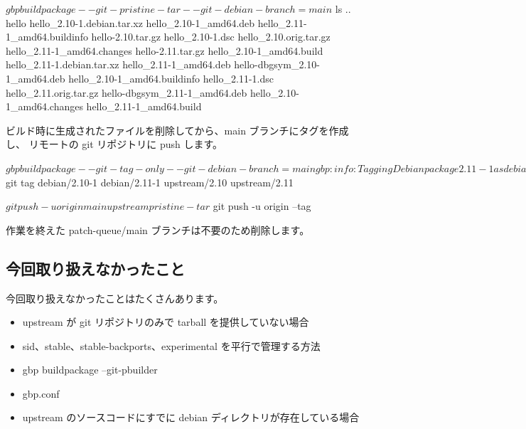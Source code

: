\documentclass[mingoth,a4paper]{jsarticle}
\begin{document}
\begin{commandline}
$ gbp buildpackage --git-pristine-tar --git-debian-branch=main

$ ls ..
hello                          hello_2.10-1.debian.tar.xz    hello_2.10-1_amd64.deb      hello_2.11-1_amd64.buildinfo
hello-2.10.tar.gz              hello_2.10-1.dsc              hello_2.10.orig.tar.gz      hello_2.11-1_amd64.changes
hello-2.11.tar.gz              hello_2.10-1_amd64.build      hello_2.11-1.debian.tar.xz  hello_2.11-1_amd64.deb
hello-dbgsym_2.10-1_amd64.deb  hello_2.10-1_amd64.buildinfo  hello_2.11-1.dsc            hello_2.11.orig.tar.gz
hello-dbgsym_2.11-1_amd64.deb  hello_2.10-1_amd64.changes    hello_2.11-1_amd64.build
\end{commandline}

ビルド時に生成されたファイルを削除してから、main ブランチにタグを作成し、
リモートの git リポジトリに push します。

\begin{commandline}
$ gbp buildpackage --git-tag-only --git-debian-branch=main
gbp:info: Tagging Debian package 2.11-1 as debian/2.11-1 in git

$ git tag
debian/2.10-1
debian/2.11-1
upstream/2.10
upstream/2.11
\end{commandline}

\begin{commandline}
$ git push -u origin main upstream pristine-tar
$ git push -u origin --tag
\end{commandline}

作業を終えた patch-queue/main ブランチは不要のため削除します。



\subsection{今回取り扱えなかったこと}

今回取り扱えなかったことはたくさんあります。

\begin{itemize}
  \item upstream が git リポジトリのみで tarball を提供していない場合
  \item sid、stable、stable-backports、experimental を平行で管理する方法
  \item gbp buildpackage --git-pbuilder
  \item gbp.conf
  \item upstream のソースコードにすでに debian ディレクトリが存在している場合
\end{itemize}
\end{document}
